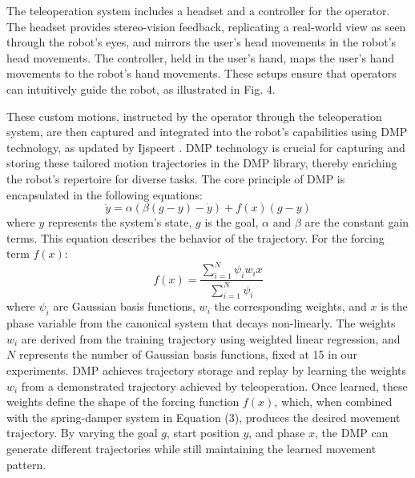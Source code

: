 \documentclass[letterpaper,conference]{ieeeconf}
\begin{document}
The teleoperation system \cite{nakanishi2020towards} includes a headset and a controller for the operator. The headset provides stereo-vision feedback, replicating a real-world view as seen through the robot's eyes, and mirrors the user's head movements in the robot's head movements. The controller, held in the user’s hand, maps the user's hand movements to the robot's hand movements. These setups ensure that operators can intuitively guide the robot, as illustrated in Fig. 4.

These custom motions, instructed by the operator through the teleoperation system, are then captured and integrated into the robot's capabilities using DMP technology, as updated by Ijspeert \cite{ijspeert2013dynamical}. DMP technology is crucial for capturing and storing these tailored motion trajectories in the DMP library, thereby enriching the robot's repertoire for diverse tasks.
The core principle of DMP is encapsulated in the following equations:
\begin{equation}
    \ddot{y} = \alpha (\beta (g - y) - \dot{y}) + f(x) (g - y)
\end{equation}
where \(y\) represents the system's state, \(g\) is the goal, \(\alpha\) and \(\beta\) are the constant gain terms. This equation describes the behavior of the trajectory. For the forcing term \(f(x)\):
\begin{equation}
    f(x) = \frac{\sum_{i=1}^{N} \psi_i w_i x}{\sum_{i=1}^{N} \psi_i}
\end{equation}
where \(\psi_i\) are Gaussian basis functions, \(w_i\) the corresponding weights, and \(x\) is the phase variable from the canonical system that decays non-linearly. The weights \(w_i\) are derived from the training trajectory using weighted linear regression, and \(N\) represents the number of Gaussian basis functions, fixed at 15 in our experiments.
DMP achieves trajectory storage and replay by learning the weights \( w_i \) from a demonstrated trajectory achieved by teleoperation. Once learned, these weights define the shape of the forcing function \( f(x) \), which, when combined with the spring-damper system in Equation (3), produces the desired movement trajectory. By varying the goal \( g \), start position \( y \), and phase \( x \), the DMP can generate different trajectories while still maintaining the learned movement pattern.
\end{document}
